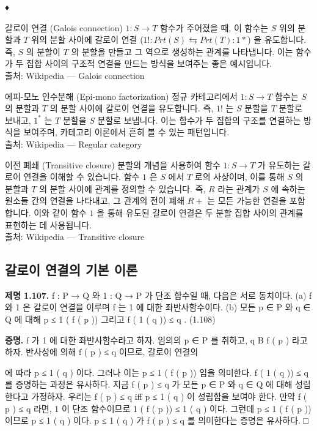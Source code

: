 \documentclass[11pt, a4paper, twoside, openany]{book}
\begin{document}
\par\medskip
♦

\begin{deepresearch}{갈로이 연결 (Galois connection)}
$1 : S \rightarrow T$ 함수가 주어졌을 때, 이 함수는 $S$ 위의 분할과 $T$ 위의 분할 사이에 갈로이 연결 ($1! : Prt(S) ⇆ Prt(T) : 1*$) 을 유도합니다.  즉, $S$ 의 분할이 $T$ 의 분할을 만들고 그 역으로 생성하는 관계를 나타냅니다. 이는 함수가 두 집합 사이의 구조적 연결을 만드는 방식을 보여주는 좋은 예시입니다.
\\[4pt]{\footnotesize\color{ctgray} 출처: Wikipedia — Galois connection}
\end{deepresearch}

\begin{deepresearch}{에피-모노 인수분해 (Epi-mono factorization)}
정규 카테고리에서 $1: S \to T$ 함수는 $S$ 의 분할과 $T$ 의 분할 사이에 갈로이 연결을 유도합니다. 즉, $1!$ 는 $S$ 분할을 $T$ 분할로 보내고, $1^*$ 는 $T$ 분할을 $S$ 분할로 보냅니다. 이는 함수가 두 집합의 구조를 연결하는 방식을 보여주며, 카테고리 이론에서 흔히 볼 수 있는 패턴입니다.
\\[4pt]{\footnotesize\color{ctgray} 출처: Wikipedia — Regular category}
\end{deepresearch}

\begin{deepresearch}{이전 폐쇄 (Transitive closure)}
분할의 개념을 사용하여 함수 $1 : S \rightarrow T$ 가 유도하는 갈로이 연결을 이해할 수 있습니다.  함수 $1$ 은 $S$ 에서 $T$ 로의 사상이며, 이를 통해 $S$ 의 분할과 $T$ 의 분할 사이에 관계를 정의할 수 있습니다.  즉, $R$ 라는 관계가 $S$ 에 속하는 원소들 간의 연결을 나타내고, 그 관계의 전이 폐쇄 $R+$ 는 모든 가능한 연결을 포함합니다. 이와 같이 함수 $1$ 을 통해 유도된 갈로이 연결은 두 분할 집합 사이의 관계를 표현하는 데 사용됩니다.
\\[4pt]{\footnotesize\color{ctgray} 출처: Wikipedia — Transitive closure}
\end{deepresearch}


\subsection{갈로이 연결의 기본 이론}
\label{sec:1-4-3}

\textbf{제명 1.107.}  f : P → Q 와 1 : Q → P 가 단조 함수일 때, 다음은 서로 동치이다.
(a) f 와 1 은 갈로이 연결을 이루며 f 는 1 에 대한 좌반사함수이다.
(b) 모든 p ∈ P 와 q ∈ Q 에 대해
p ≤ 1 ( f ( p ))
그리고
f ( 1 ( q )) ≤ q .  (1.108)

\par\medskip
\textbf{증명.} f 가 1 에 대한 좌반사함수라고 하자. 임의의 p ∈ P 를 취하고, q B f ( p ) 라고 하자. 반사성에 의해 f ( p ) ≤ q 이므로, 갈로이 연결의 
\begin{definitionbox}[정의 1.95]
에 따라 p ≤ 1 ( q ) 이다. 그러나 이는 p ≤ 1 ( f ( p )) 임을 의미한다. f ( 1 ( q )) ≤ q 를 증명하는 과정은 유사하다.
지금 f ( p ) ≤ q 가 모든 p ∈ P 와 q ∈ Q 에 대해 성립한다고 가정하자. 우리는 f ( p ) ≤ q iﬀ p ≤ 1 ( q ) 이 성립함을 보여야 한다. 만약 f ( p ) ≤ q 라면, 1 이 단조 함수이므로 1 ( f ( p )) ≤ 1 ( q ) 이다. 그런데 p ≤ 1 ( f ( p )) 이므로 p ≤ 1 ( q ) 이다. p ≤ 1 ( q ) 가 f ( p ) ≤ q 를 의미한다는 증명은 유사하다. □
\end{definitionbox}
\end{document}
